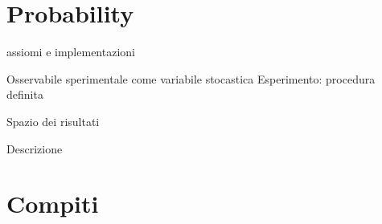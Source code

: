 \section{Probability}

\begin{frame}{assiomi e implementazioni}
\begin{block}{Osservabile sperimentale come variabile stocastica}
Esperimento: procedura definita
\end{block}

\begin{block}{Spazio dei risultati}

\end{block}



\end{frame}

\begin{wordonframe}{Descrizione}

\end{wordonframe}

\section{Compiti}

